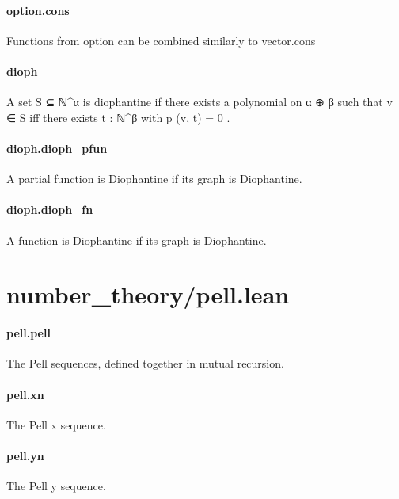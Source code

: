 \documentclass{article}
\begin{document}
\paragraph{option.cons}
\par
Functions from 
\colorbox[RGB]{253,246,227}{{{{\color[RGB]{101, 123, 131} option }}}} can be combined similarly to 
\colorbox[RGB]{253,246,227}{{{{\color[RGB]{101, 123, 131} vector.cons }}}}\paragraph{dioph}
\par
A set 
\colorbox[RGB]{253,246,227}{{{{\color[RGB]{101, 123, 131} S ⊆ ℕ\textasciicircum{}α }}}} is diophantine if there exists a polynomial on
\colorbox[RGB]{253,246,227}{{{{\color[RGB]{101, 123, 131} α ⊕ β }}}} such that 
\colorbox[RGB]{253,246,227}{{{{\color[RGB]{101, 123, 131} v ∈ S }}}} iff there exists 
\colorbox[RGB]{253,246,227}{{{{\color[RGB]{101, 123, 131} t : ℕ\textasciicircum{}β }}}} with 
\colorbox[RGB]{253,246,227}{{{{\color[RGB]{101, 123, 131} p (v, t)  }}}{{{\color[RGB]{181, 137, 0} = }}}{{{\color[RGB]{101, 123, 131}   }}}{{{\color[RGB]{108, 113, 196} 0 }}}}.
\paragraph{dioph.dioph\_pfun}
\par
A partial function is Diophantine if its graph is Diophantine.
\paragraph{dioph.dioph\_fn}
\par
A function is Diophantine if its graph is Diophantine.
\section{number\_theory/pell.lean}\paragraph{pell.pell}
\par
The Pell sequences, defined together in mutual recursion.
\paragraph{pell.xn}
\par
The Pell 
\colorbox[RGB]{253,246,227}{{{{\color[RGB]{101, 123, 131} x }}}} sequence.
\paragraph{pell.yn}
\par
The Pell 
\colorbox[RGB]{253,246,227}{{{{\color[RGB]{101, 123, 131} y }}}} sequence.
\end{document}
